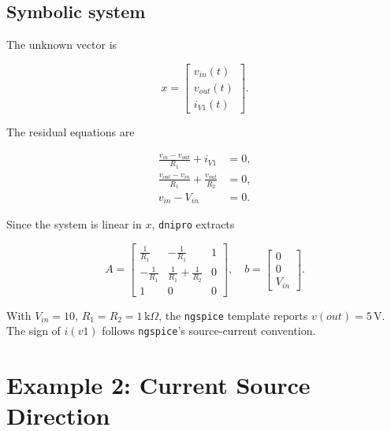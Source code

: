 \documentclass[11pt,a4paper]{article}
\newcommand{\project}{\texttt{dnipro}}
\newcommand{\ngspice}{\texttt{ngspice}}
\begin{document}


\subsection{Symbolic system}

The unknown vector is

\begin{equation}
    x =
    \begin{bmatrix}
        v_{in}(t) \\
        v_{out}(t) \\
        i_{V1}(t)
    \end{bmatrix}.
\end{equation}

The residual equations are

\begin{align}
    \frac{v_{in}-v_{out}}{R_1} + i_{V1} &= 0, \\
    \frac{v_{out}-v_{in}}{R_1} + \frac{v_{out}}{R_2} &= 0, \\
    v_{in} - V_{in} &= 0.
\end{align}

Since the system is linear in \(x\), \project{} extracts

\begin{equation}
    A =
    \begin{bmatrix}
        \frac{1}{R_1} & -\frac{1}{R_1} & 1 \\
        -\frac{1}{R_1} & \frac{1}{R_1}+\frac{1}{R_2} & 0 \\
        1 & 0 & 0
    \end{bmatrix},
    \quad
    b =
    \begin{bmatrix}
        0 \\
        0 \\
        V_{in}
    \end{bmatrix}.
\end{equation}

With \(V_{in}=10\), \(R_1=R_2=1\,\mathrm{k}\Omega\), the \ngspice{} template
reports \(v(out)=5\,\mathrm{V}\). The sign of \(i(v1)\) follows \ngspice{}'s
source-current convention.

\section{Example 2: Current Source Direction}
\label{sec:ex-current-source-direction}
\end{document}
